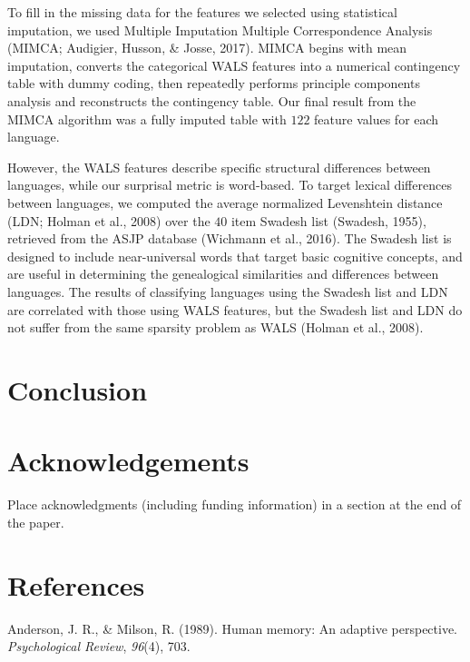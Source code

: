 \documentclass[10pt, letterpaper]{article}
\begin{document}
To fill in the missing data for the features we selected using
statistical imputation, we used Multiple Imputation Multiple
Correspondence Analysis (MIMCA; Audigier, Husson, \& Josse, 2017). MIMCA
begins with mean imputation, converts the categorical WALS features into
a numerical contingency table with dummy coding, then repeatedly
performs principle components analysis and reconstructs the contingency
table. Our final result from the MIMCA algorithm was a fully imputed
table with \(122\) feature values for each language.

However, the WALS features describe specific structural differences
between languages, while our surprisal metric is word-based. To target
lexical differences between languages, we computed the average
normalized Levenshtein distance (LDN; Holman et al., 2008) over the
\(40\) item Swadesh list (Swadesh, 1955), retrieved from the ASJP
database (Wichmann et al., 2016). The Swadesh list is designed to
include near-universal words that target basic cognitive concepts, and
are useful in determining the genealogical similarities and differences
between languages. The results of classifying languages using the
Swadesh list and LDN are correlated with those using WALS features, but
the Swadesh list and LDN do not suffer from the same sparsity problem as
WALS (Holman et al., 2008).

\hypertarget{conclusion}{%
\section{Conclusion}\label{conclusion}}

\hypertarget{acknowledgements}{%
\section{Acknowledgements}\label{acknowledgements}}

Place acknowledgments (including funding information) in a section at
the end of the paper.

\hypertarget{references}{%
\section{References}\label{references}}

\setlength{\parindent}{-0.1in} 
\setlength{\leftskip}{0.125in}

\noindent

\hypertarget{refs}{}
\leavevmode\hypertarget{ref-anderson1989}{}%
Anderson, J. R., \& Milson, R. (1989). Human memory: An adaptive
perspective. \emph{Psychological Review}, \emph{96}(4), 703.
\end{document}

